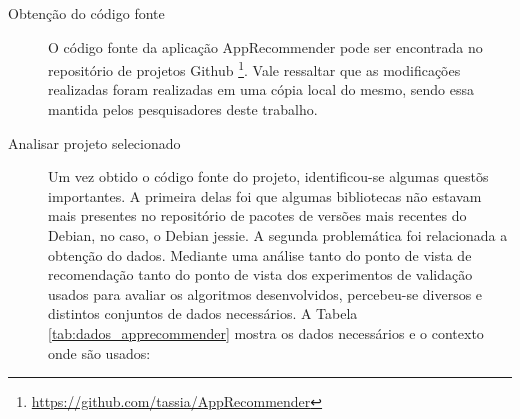 \begin{description}

\item[Obtenção do código fonte]

O código fonte da aplicação AppRecommender pode ser encontrada no repositório de projetos Github \footnote{\url{https://github.com/tassia/AppRecommender}}.
Vale ressaltar que as modificações realizadas foram realizadas em uma cópia local do mesmo, sendo essa mantida pelos pesquisadores deste trabalho.

\item[Analisar projeto selecionado]

Um vez obtido o código fonte do projeto, identificou-se algumas questõs
importantes. A primeira delas foi que algumas bibliotecas não estavam mais
presentes no repositório de pacotes de versões mais recentes do Debian, no caso,
o Debian jessie. A segunda problemática foi relacionada a obtenção do dados.
Mediante uma análise tanto do ponto de vista de recomendação tanto do ponto de
vista dos experimentos de validação usados para avaliar os algoritmos
desenvolvidos, percebeu-se diversos e distintos conjuntos de dados necessários.
A Tabela \ref{tab:dados_apprecommender} mostra os dados necessários e o contexto
onde são usados:
\end{description}


